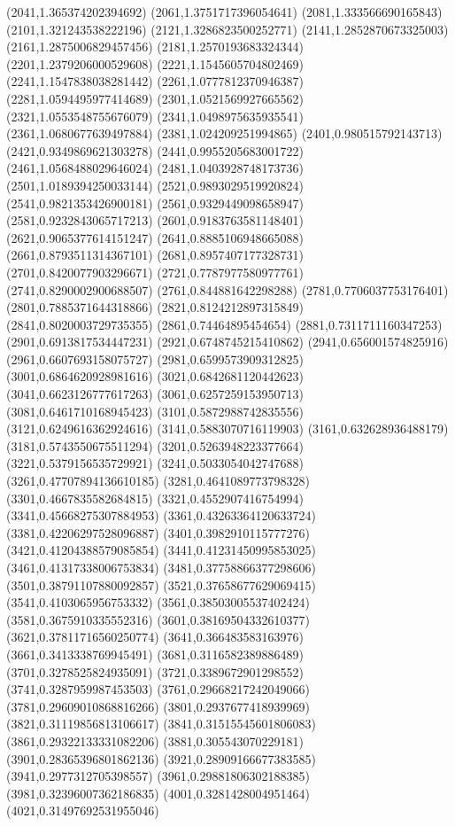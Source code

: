 {(2041,1.365374202394692)
(2061,1.3751717396054641)
(2081,1.333566690165843)
(2101,1.321243538222196)
(2121,1.3286823500252771)
(2141,1.2852870673325003)
(2161,1.2875006829457456)
(2181,1.2570193683324344)
(2201,1.2379206000529608)
(2221,1.1545605704802469)
(2241,1.1547838038281442)
(2261,1.0777812370946387)
(2281,1.0594495977414689)
(2301,1.0521569927665562)
(2321,1.0553548755676079)
(2341,1.0498975635935541)
(2361,1.0680677639497884)
(2381,1.024209251994865)
(2401,0.980515792143713)
(2421,0.9349869621303278)
(2441,0.9955205683001722)
(2461,1.0568488029646024)
(2481,1.0403928748173736)
(2501,1.0189394250033144)
(2521,0.9893029519920824)
(2541,0.9821353426900181)
(2561,0.9329449098658947)
(2581,0.9232843065717213)
(2601,0.9183763581148401)
(2621,0.9065377614151247)
(2641,0.8885106948665088)
(2661,0.8793511314367101)
(2681,0.8957407177328731)
(2701,0.8420077903296671)
(2721,0.7787977580977761)
(2741,0.8290002900688507)
(2761,0.844881642298288)
(2781,0.7706037753176401)
(2801,0.7885371644318866)
(2821,0.8124212897315849)
(2841,0.8020003729735355)
(2861,0.74464895454654)
(2881,0.7311711160347253)
(2901,0.6913817534447231)
(2921,0.6748745215410862)
(2941,0.656001574825916)
(2961,0.6607693158075727)
(2981,0.6599573909312825)
(3001,0.6864620928981616)
(3021,0.6842681120442623)
(3041,0.6623126777617263)
(3061,0.6257259153950713)
(3081,0.6461710168945423)
(3101,0.5872988742835556)
(3121,0.6249616362924616)
(3141,0.5883070716119903)
(3161,0.632628936488179)
(3181,0.5743550675511294)
(3201,0.5263948223377664)
(3221,0.5379156535729921)
(3241,0.5033054042747688)
(3261,0.47707894136610185)
(3281,0.4641089773798328)
(3301,0.4667835582684815)
(3321,0.4552907416754994)
(3341,0.45668275307884953)
(3361,0.43263364120633724)
(3381,0.42206297528096887)
(3401,0.3982910115777276)
(3421,0.41204388579085854)
(3441,0.41231450995853025)
(3461,0.41317338006753834)
(3481,0.37758866377298606)
(3501,0.38791107880092857)
(3521,0.37658677629069415)
(3541,0.4103065956753332)
(3561,0.38503005537402424)
(3581,0.3675910335552316)
(3601,0.38169504332610377)
(3621,0.37811716560250774)
(3641,0.366483583163976)
(3661,0.3413338769945491)
(3681,0.3116582389886489)
(3701,0.3278525824935091)
(3721,0.3389672901298552)
(3741,0.3287959987453503)
(3761,0.29668217242049066)
(3781,0.29609010868816266)
(3801,0.2937677418939969)
(3821,0.31119856813106617)
(3841,0.31515545601806083)
(3861,0.29322133331082206)
(3881,0.305543070229181)
(3901,0.28365396801862136)
(3921,0.28909166677383585)
(3941,0.2977312705398557)
(3961,0.29881806302188385)
(3981,0.32396007362186835)
(4001,0.3281428004951464)
(4021,0.31497692531955046)
}
